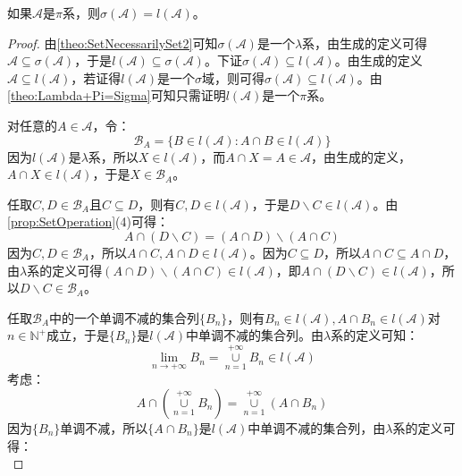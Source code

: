\begin{theorem}\label{theo:SigmaPi=LambdaPi}
	如果$\mathscr{A}$是$\pi$系，则$\sigma(\mathscr{A})=l(\mathscr{A})$。
\end{theorem}
\begin{proof}
	由\cref{theo:SetNecessarilySet2}可知$\sigma(\mathscr{A})$是一个$\lambda$系，由生成的定义可得$\mathscr{A}\subseteq\sigma(\mathscr{A})$，于是$l(\mathscr{A})\subseteq\sigma(\mathscr{A})$。下证$\sigma(\mathscr{A})\subseteq l(\mathscr{A})$。由生成的定义$\mathscr{A}\subseteq l(\mathscr{A})$，若证得$l(\mathscr{A})$是一个$\sigma$域，则可得$\sigma(\mathscr{A})\subseteq l(\mathscr{A})$。由\cref{theo:Lambda+Pi=Sigma}可知只需证明$l(\mathscr{A})$是一个$\pi$系。\par
	对任意的$A\in \mathscr{A}$，令：
	\begin{equation*}
		\mathscr{B}_A=\{B\in l(\mathscr{A}):A\cap B\in l(\mathscr{A})\}
	\end{equation*}
	因为$l(\mathscr{A})$是$\lambda$系，所以$X\in l(\mathscr{A})$，而$A\cap X=A\in\mathscr{A}$，由生成的定义，$A\cap X\in l(\mathscr{A})$，于是$X\in \mathscr{B}_A$。\par
	任取$C,D\in \mathscr{B}_A$且$C\subseteq D$，则有$C,D\in l(\mathscr{A})$，于是$D\backslash C\in l(\mathscr{A})$。由\cref{prop:SetOperation}(4)可得：
	\begin{equation*}
		A\cap(D\backslash C)=(A\cap D)\backslash(A\cap C)
	\end{equation*}
	因为$C,D\in \mathscr{B}_A$，所以$A\cap C,A\cap D\in l(\mathscr{A})$。因为$C\subseteq D$，所以$A\cap C\subseteq A\cap D$，由$\lambda$系的定义可得$(A\cap D)\backslash(A\cap C)\in l(\mathscr{A})$，即$A\cap(D\backslash C)\in l(\mathscr{A})$，所以$D\backslash C\in \mathscr{B}_A$。\par
	任取$\mathscr{B}_A$中的一个单调不减的集合列$\{B_n\}$，则有$B_n\in l(\mathscr{A}),A\cap B_n\in l(\mathscr{A})$对$n\in\mathbb{N}^+$成立，于是$\{B_n\}$是$l(\mathscr{A})$中单调不减的集合列。由$\lambda$系的定义可知：
	\begin{equation*}
		\lim_{n\to+\infty}B_n=\underset{n=1}{\overset{+\infty}{\cup}}B_n\in l(\mathscr{A})
	\end{equation*}
	考虑：
	\begin{equation*}
		A\cap\left(\underset{n=1}{\overset{+\infty}{\cup}}B_n\right)
		=\underset{n=1}{\overset{+\infty}{\cup}}(A\cap B_n)
	\end{equation*}
	因为$\{B_n\}$单调不减，所以$\{A\cap B_n\}$是$l(\mathscr{A})$中单调不减的集合列，由$\lambda$系的定义可得：
	\begin{equation*}

\end{equation*}
\end{proof}
